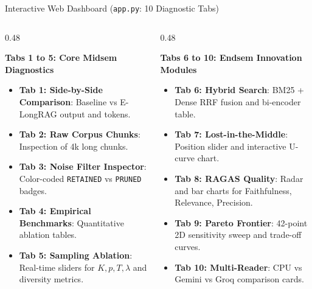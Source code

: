 \documentclass[10pt,aspectratio=169]{beamer}
\begin{document}
\begin{frame}{Interactive Web Dashboard (\texttt{app.py}: 10 Diagnostic Tabs)}
    \begin{columns}[onlytextwidth,T]
        \begin{column}{0.48\textwidth}
            \begin{block}{\textbf{Tabs 1 to 5: Core Midsem Diagnostics}}
                \scriptsize
                \begin{itemize}\setlength\itemsep{1.5pt}
                    \item \textbf{Tab 1: Side-by-Side Comparison}: Baseline vs E-LongRAG output and tokens.
                    \item \textbf{Tab 2: Raw Corpus Chunks}: Inspection of 4k long chunks.
                    \item \textbf{Tab 3: Noise Filter Inspector}: Color-coded \texttt{RETAINED} vs \texttt{PRUNED} badges.
                    \item \textbf{Tab 4: Empirical Benchmarks}: Quantitative ablation tables.
                    \item \textbf{Tab 5: Sampling Ablation}: Real-time sliders for $K, p, T, \lambda$ and diversity metrics.
                \end{itemize}
            \end{block}
        \end{column}
        
        \begin{column}{0.48\textwidth}
            \begin{block}{\textbf{Tabs 6 to 10: Endsem Innovation Modules}}
                \scriptsize
                \begin{itemize}\setlength\itemsep{1.5pt}
                    \item \textbf{Tab 6: Hybrid Search}: BM25 + Dense RRF fusion and bi-encoder table.
                    \item \textbf{Tab 7: Lost-in-the-Middle}: Position slider and interactive U-curve chart.
                    \item \textbf{Tab 8: RAGAS Quality}: Radar and bar charts for Faithfulness, Relevance, Precision.
                    \item \textbf{Tab 9: Pareto Frontier}: 42-point 2D sensitivity sweep and trade-off curves.
                    \item \textbf{Tab 10: Multi-Reader}: CPU vs Gemini vs Groq comparison cards.
                \end{itemize}
            \end{block}
        \end{column}
    \end{columns}
\end{frame}
\end{document}
